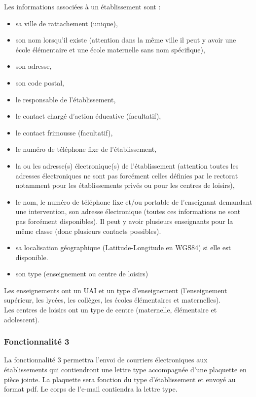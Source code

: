 Les informations associées à un établissement sont :
\begin{itemize}
\item sa ville de rattachement (unique), 
\item son nom lorsqu'il existe (attention dans la même ville il peut y avoir une école élémentaire et une école maternelle sans nom spécifique), 
\item son adresse,
\item son code postal,
\item le responsable de l'établissement, 
\item le contact chargé d'action éducative (facultatif),
\item le contact frimousse (facultatif),
\item le numéro de téléphone fixe de l'établissement, 
\item la ou les adresse(s) électronique(s) de l'établissement (attention toutes les adresses électroniques ne sont pas forcément celles définies par le rectorat notamment pour les établissements privés ou pour les centres de loisirs), 
\item le nom, le numéro de téléphone fixe et/ou portable de l'enseignant demandant une intervention, son adresse électronique (toutes ces informations ne sont pas forcément disponibles). Il peut y avoir plusieurs enseignants pour la même classe (donc plusieurs contacts possibles).
\item sa localisation géographique (Latitude-Longitude en WGS84) si elle est disponible.
\item son type (enseignement ou centre de loisirs)
\\
\end{itemize}
Les enseignements ont un UAI et un type d'enseignement (l'enseignement supérieur, les lycées, les collèges, les écoles élémentaires et maternelles). \\
Les centres de loisirs ont un type de centre (maternelle, élémentaire et adolescent). 
\\

\subsubsection{Fonctionnalité 3}
La fonctionnalité 3 permettra l'envoi de courriers électroniques aux établissements qui contiendront une lettre type accompagnée d'une plaquette en pièce jointe. La plaquette sera fonction du type d'établissement et envoyé au format pdf. Le corps de l'e-mail contiendra la lettre type. 

